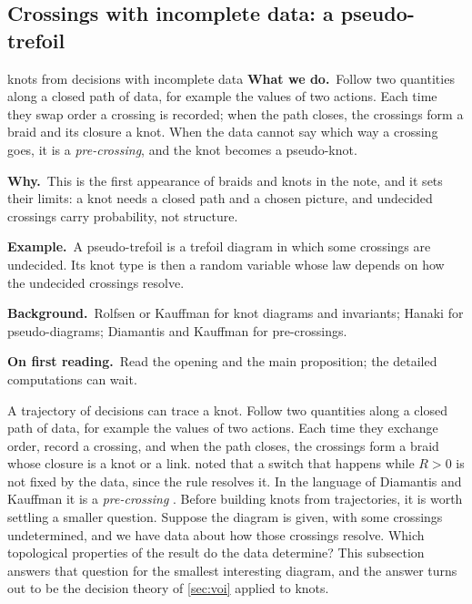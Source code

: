 \documentclass[11pt]{article}
\theoremstyle{definition}\newtheorem{definition}[theorem]{Definition}\newtheorem{remark}[theorem]{Remark}\newtheorem{example}[theorem]{Example}\newtheorem{problem}[theorem]{Open problem}\crefname{problem}{Problem}{Problems}
\newcommand{\rbwhat}{\textcolor{rbWhat}{\textbf{What we do.}}~}\newcommand{\rbwhy}{\par\smallskip\textcolor{rbWhy}{\textbf{Why.}}~}
\newcommand{\rbex}{\par\smallskip\textcolor{rbEx}{\textbf{Example.}}~}\newcommand{\rbbg}{\par\smallskip\textcolor{rbBg}{\textbf{Background.}}~}
\newcommand{\rbfirst}{\par\smallskip\textcolor{rbFirst}{\textbf{On first reading.}}~}
\begin{document}
\subsection{Crossings with incomplete data: a pseudo-trefoil}\label{sec:pseudoknot}
\begin{readerbox}{knots from decisions with incomplete data}
\rbwhat Follow two quantities along a closed path of data, for example the values of two actions. Each time they swap order a crossing is recorded; when the path closes, the crossings form a braid and its closure a knot. When the data cannot say which way a crossing goes, it is a \emph{pre-crossing}, and the knot becomes a pseudo-knot.
\rbwhy This is the first appearance of braids and knots in the note, and it sets their limits: a knot needs a closed path and a chosen picture, and undecided crossings carry probability, not structure.
\rbex A pseudo-trefoil is a trefoil diagram in which some crossings are undecided. Its knot type is then a random variable whose law depends on how the undecided crossings resolve.
\rbbg Rolfsen \cite{Rolfsen1976} or Kauffman \cite{Kauffman1987} for knot diagrams and invariants; Hanaki \cite{Hanaki2010} for pseudo-diagrams; Diamantis and Kauffman \cite{DiamantisKauffman2026} for pre-crossings.
\rbfirst Read the opening and the main proposition; the detailed computations can wait.
\end{readerbox}
A trajectory of decisions can trace a knot. Follow two quantities along a closed path of data, for example the values of two actions. Each time they exchange order, record a crossing, and when the path closes, the crossings form a braid whose closure is a knot or a link.  noted that a switch that happens while $R>0$ is not fixed by the data, since the rule resolves it. In the language of Diamantis and Kauffman it is a \emph{pre-crossing} \cite{DiamantisKauffman2026}. Before building knots from trajectories, it is worth settling a smaller question. Suppose the diagram is given, with some crossings undetermined, and we have data about how those crossings resolve. Which topological properties of the result do the data determine? This subsection answers that question for the smallest interesting diagram, and the answer turns out to be the decision theory of \cref{sec:voi} applied to knots.
\end{document}

